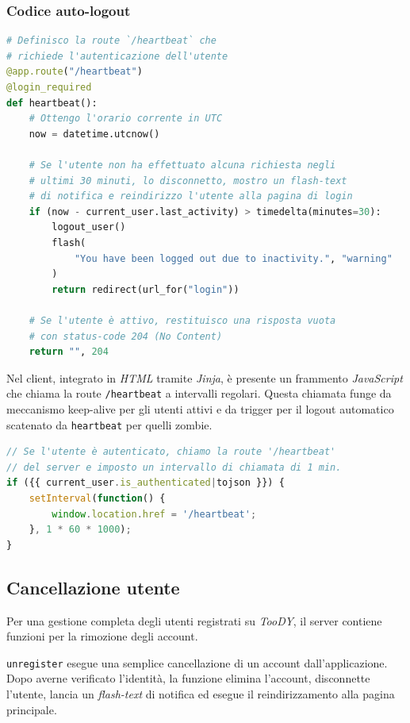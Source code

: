 \documentclass[12pt]{report}
\newcommand{\toody}{\textsl{TooDY}\xspace}
\newcommand{\jinja}{\textsl{Jinja}\xspace}
\newcommand{\javascript}{\textsl{JavaScript}\xspace}
\newcommand{\html}{\textsl{HTML}\xspace}
\begin{document}
\subsubsection{Codice auto-logout}
\begin{lstlisting}[language=Python]
# Definisco la route `/heartbeat` che
# richiede l'autenticazione dell'utente
@app.route("/heartbeat")
@login_required
def heartbeat():
    # Ottengo l'orario corrente in UTC
    now = datetime.utcnow()

    # Se l'utente non ha effettuato alcuna richiesta negli
    # ultimi 30 minuti, lo disconnetto, mostro un flash-text
    # di notifica e reindirizzo l'utente alla pagina di login
    if (now - current_user.last_activity) > timedelta(minutes=30):
        logout_user()
        flash(
            "You have been logged out due to inactivity.", "warning"
        )
        return redirect(url_for("login"))

    # Se l'utente è attivo, restituisco una risposta vuota
    # con status-code 204 (No Content)
    return "", 204
\end{lstlisting}


\begin{mdframed}
\small
Nel client, integrato in \html tramite \jinja, è presente un frammento \javascript che chiama la route \texttt{/heartbeat} a intervalli regolari. Questa chiamata funge da meccanismo keep-alive per gli utenti attivi e da trigger per il logout automatico scatenato da \texttt{heartbeat} per quelli zombie.

\begin{lstlisting}[language=JavaScript]
// Se l'utente è autenticato, chiamo la route '/heartbeat'
// del server e imposto un intervallo di chiamata di 1 min.
if ({{ current_user.is_authenticated|tojson }}) {
    setInterval(function() {
        window.location.href = '/heartbeat';
    }, 1 * 60 * 1000);
}
\end{lstlisting}
\end{mdframed}


\subsection{Cancellazione utente}
Per una gestione completa degli utenti registrati su \toody, il server contiene funzioni per la rimozione degli account.

\texttt{unregister} esegue una semplice cancellazione di un account dall'applicazione. Dopo averne verificato l'identità, la funzione elimina l'account, disconnette l'utente, lancia un \textit{flash-text} di notifica ed esegue il reindirizzamento alla pagina principale.
\end{document}
